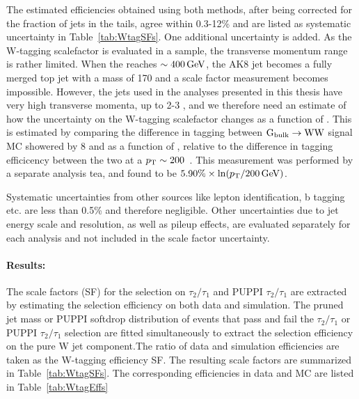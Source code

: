 The estimated efficiencies obtained using both methods, after being corrected for the fraction of \PW jets in the tails, agree within 0.3-12\% and are listed as systematic uncertainty in Table~\ref{tab:WtagSFs}.\newline
One additional uncertainty is added. As the W-tagging scalefactor is evaluated in a \ttbar sample, the transverse momentum range is rather limited. When the \PW \PT reaches $\sim 400 \,\text{Ge\hspace{-.08em}V}$, the AK8 jet becomes a fully merged top jet with a mass of 170 \GeV and a scale factor measurement becomes impossible. However, the jets used in the analyses presented in this thesis have very high transverse momenta, up to 2-3 \TeV, and we therefore need an estimate of how the uncertainty on the W-tagging scalefactor changes as a function of \PT. This is estimated by comparing the difference in tagging between $\mathrm{G}_\mathrm{bulk} \rightarrow \mathrm{W} \mathrm{W}$ signal MC showered by \PYTHIA{}8 and \HERWIG{++} as a function of \PT, relative to the difference in tagging efficicency between the two at a $p_{\mathrm{T}} \sim 200$~\GeV. This measurement was performed by a separate analysis tea, and found to be $5.90\% \times \ln(p_{\mathrm{T}}/200\,\text{Ge\hspace{-.08em}V})$.


Systematic uncertainties from other sources like lepton identification, b tagging etc. are less than 0.5\% and therefore negligible. Other uncertainties due to jet energy scale and resolution, as well as pileup effects, are evaluated separately for each analysis and not included in the scale factor uncertainty.

\paragraph{Results:}
The scale factors (SF) for the selection on $\tau_2 / \tau_1 $ and PUPPI $\tau_2 / \tau_1$ are
extracted by estimating the selection efficiency on both data and
simulation.  The pruned jet mass or PUPPI softdrop distribution of events that pass and fail
the $\tau_2 / \tau_1$ or PUPPI $\tau_2 / \tau_1$ selection are fitted
simultaneously to extract the selection efficiency on the pure W jet
component.The ratio of data and simulation efficiencies are taken as
the W-tagging efficiency SF. The resulting scale factors are summarized in Table~\ref{tab:WtagSFs}. The corresponding efficiencies in data and MC are listed in Table~\ref{tab:WtagEffs}


